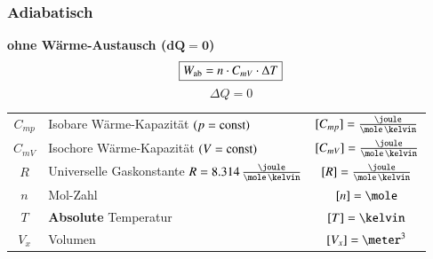 \subsubsection{Adiabatisch}



\begin{minipage}[c]{0.60\columnwidth}
	\textbf{ohne Wärme-Austausch ($\bm{dQ = 0}$)}
	$$ \boxed{ W_{\rm ab} = n \cdot C_{mV} \cdot \Delta T }  $$
	$$ \boxed{ \Delta Q = 0} $$
\end{minipage}
\hfill
\begin{minipage}[c]{0.35\columnwidth}
	\resizebox{\linewidth}{!}{}
\end{minipage}

\medskip

\renewcommand{\arraystretch}{1.3}
\begin{tabular}{c l c}
	$C_{mp}$ 	& Isobare Wärme-Kapazität $(p = \mathop{} \! \mathrm{const})$ 									& $[C_{mp}] = \frac{\joule}{\mole \, \kelvin}$	\\
	$C_{mV}$ 	& Isochore Wärme-Kapazität $(V = \mathop{} \! \mathrm{const})$ 									& $[C_{mV}] = \frac{\joule}{\mole \, \kelvin}$	\\
	$R$			& Universelle Gaskonstante $R = 8.314 \, \frac{\joule}{\mole \, \kelvin}$ 	& $[R] = \frac{\joule}{\mole \, \kelvin}$		\\
	$n$ 		& Mol-Zahl 																	& $[n] = \mole$ 								\\
	$T$			& \textbf{Absolute} Temperatur												& $[T] = \kelvin$								\\
	$V_x$		& Volumen																	& $[V_x] = \meter^3$
\end{tabular}
\renewcommand{\arraystretch}{1}
